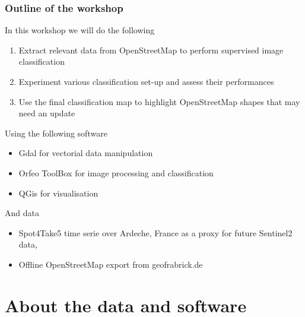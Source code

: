 \documentclass[8pt]{beamer}
\begin{document}
\begin{frame}
\frametitle{Outline of the workshop}
\begin{block}{In this workshop we will do the following}
\begin{enumerate}
\item Extract relevant data from OpenStreetMap to perform supervised image classification
\item Experiment various classification set-up and assess their performances
\item Use the final classification map to highlight OpenStreetMap shapes that may need an update
\end{enumerate}
\end{block}
\begin{block}{Using the following software}
\begin{itemize}
\item Gdal for vectorial data manipulation
\item Orfeo ToolBox for image processing and classification
\item QGis for visualisation
\end{itemize}
\end{block}
\begin{block}{And data}
\begin{itemize}
\item Spot4Take5 time serie over Ardeche, France as a proxy for future Sentinel2 data,
\item Offline OpenStreetMap export from geofrabrick.de
\end{itemize}
\end{block}

\end{frame}
\section{About the data and software}
\end{document}
